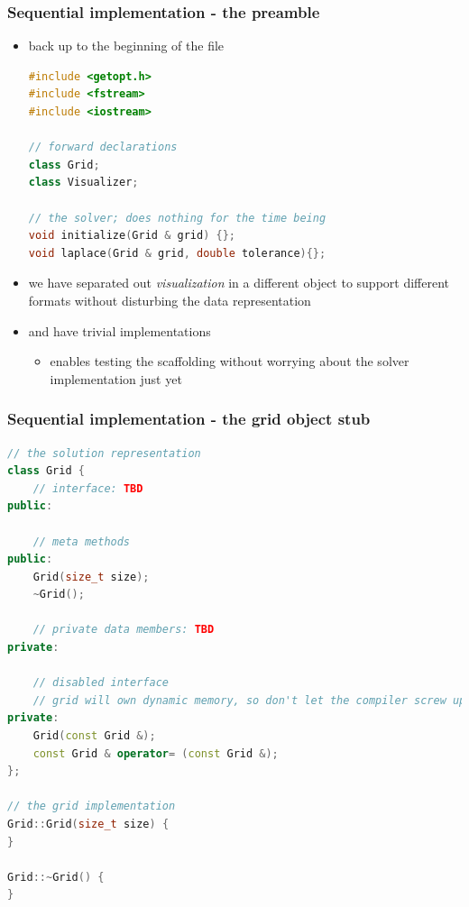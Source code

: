 \begin{frame}[fragile]
%
  \frametitle{Sequential implementation - the preamble}
%
  \begin{itemize}
  \item back up to the beginning of the file
    \begin{lstlisting}[language=c++,name=seq:frame, firstnumber=1]
#include <getopt.h>
#include <fstream>
#include <iostream>

// forward declarations
class Grid;
class Visualizer;

// the solver; does nothing for the time being
void initialize(Grid & grid) {};
void laplace(Grid & grid, double tolerance){};

    \end{lstlisting}
%
  \item we have separated out {\em visualization} in a different object to support different
    formats without disturbing the data representation
%
  \item {} and  have trivial implementations
    \begin{itemize}
    \item enables testing the scaffolding without worrying about the solver
      implementation just yet
    \end{itemize}
  \end{itemize}
% 
\end{frame}

\begin{frame}[fragile]
%
  \frametitle{Sequential implementation - the grid object stub}
%
  \begin{lstlisting}[language=c++,name=seq:frame]
// the solution representation
class Grid {
    // interface: TBD
public:

    // meta methods
public:
    Grid(size_t size);
    ~Grid();

    // private data members: TBD
private:

    // disabled interface
    // grid will own dynamic memory, so don't let the compiler screw up
private:
    Grid(const Grid &);
    const Grid & operator= (const Grid &);
};

// the grid implementation
Grid::Grid(size_t size) {
}

Grid::~Grid() {
}

  \end{lstlisting}
% 
\end{frame}

